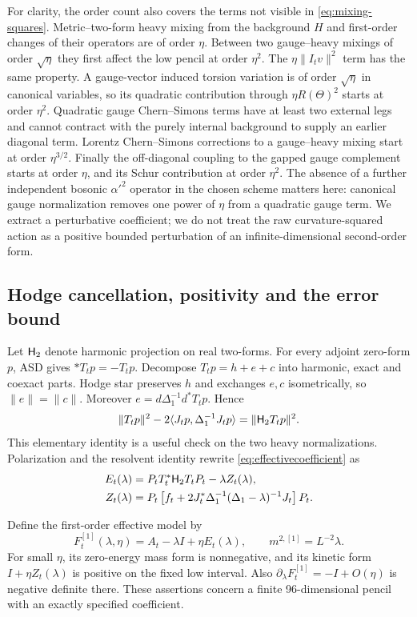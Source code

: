 For clarity, the order count also covers the terms not visible in
\eqref{eq:mixing-squares}. Metric--two-form heavy mixing from the
background $H$ and first-order changes of their operators are of
order $\eta$. Between two gauge--heavy mixings of order
$\sqrt\eta$ they first affect the low pencil at order $\eta^2$.
The $\eta\|I_tv\|^2$ term has the same property. A gauge-vector
induced torsion variation is of order $\sqrt\eta$ in canonical
variables, so its quadratic contribution through
$\eta R(\Theta)^2$ starts at order $\eta^2$.
Quadratic gauge Chern--Simons terms have at least two external legs
and cannot contract with the purely internal background to supply
an earlier diagonal term. Lorentz Chern--Simons corrections to a
gauge--heavy mixing start at order $\eta^{3/2}$. Finally the
off-diagonal coupling to the gapped gauge complement starts at
order $\eta$, and its Schur contribution at order $\eta^2$.
The absence of a further independent bosonic $\alpha'^2$ operator
in the chosen scheme matters here: canonical gauge normalization
removes one power of $\eta$ from a quadratic gauge term.
We extract a perturbative coefficient; we do not treat the raw
curvature-squared action as a positive bounded perturbation of an
infinite-dimensional second-order form.

\subsection{Hodge cancellation, positivity and the error bound}
Let $\mathsf H_2$ denote harmonic projection on real two-forms. For every
adjoint zero-form $p$, ASD gives $*T_tp=-T_tp$. Decompose
$T_tp=h+e+c$ into harmonic, exact and coexact parts. Hodge star
preserves $h$ and exchanges $e,c$ isometrically, so
$\|e\|=\|c\|$. Moreover
$e=d\Delta_1^{-1}d^*T_tp$. Hence
\begin{equation}\label{eq:Hodgeidentity}
 \|T_tp\|^2-2\langle J_tp,\Delta_1^{-1}J_tp\rangle
                   =\|\mathsf H_2T_tp\|^2.
\end{equation}
This elementary identity is a useful check on the two heavy
normalizations. Polarization and the resolvent identity rewrite
\eqref{eq:effectivecoefficient} as
\begin{align}\label{eq:Epositive}
 E_t(\lambda)&=P_tT_t^*\mathsf H_2T_tP_t-\lambda Z_t(\lambda),\\
 Z_t(\lambda)&=P_t\left[f_t+
 2J_t^*\Delta_1^{-1}(\Delta_1-\lambda)^{-1}J_t\right]P_t.
 \nonumber
\end{align}

Define the first-order effective model by
\begin{equation}\label{eq:pencil}
 F_t^{[1]}(\lambda,\eta)=A_t-\lambda I+\eta E_t(\lambda),
 \qquad m^{2,[1]}=L^{-2}\lambda.
\end{equation}
For small $\eta$, its zero-energy mass form is nonnegative,
and its kinetic form $I+\eta Z_t(\lambda)$ is positive on the
fixed low interval. Also $\partial_\lambda F_t^{[1]}=-I+O(\eta)$
is negative definite there. These assertions concern a finite
96-dimensional pencil with an exactly specified coefficient.

